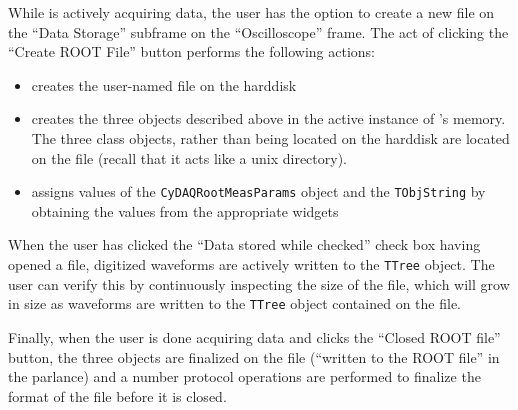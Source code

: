While \ADAQ is actively acquiring data, the user has
the option to create a new \ROOT file on the ``Data Storage'' subframe
on the ``Oscilloscope'' frame. The act of clicking the ``Create ROOT
File'' button performs the following actions:
\begin{itemize}
  \item{creates the user-named \ROOT file on the harddisk}
  \item{creates the three objects described above in the active
    instance of \ROOT's memory. The three class objects, rather than
    being located on the harddisk are located on the \ROOT file
    (recall that it acts like a unix directory).}
  \item{assigns values of the \texttt{CyDAQRootMeasParams} object and
    the \texttt{TObjString} by obtaining the values from the
    appropriate \ADAQ widgets}
\end{itemize}

When the user has clicked the ``Data stored while checked'' check box
having opened a \ROOT file, digitized waveforms are actively written
to the \ROOT \texttt{TTree} object. The user can verify this by
continuously inspecting the size of the \ROOT file, which will grow in
size as waveforms are written to the \ROOT \texttt{TTree} object
contained on the \ROOT file. 

Finally, when the user is done acquiring data and clicks the ``Closed
ROOT file'' button, the three objects are finalized on the \ROOT file
(``written to the ROOT file'' in the \ROOT parlance) and a number
\ROOT protocol operations are performed to finalize the format of the
\ROOT file before it is closed.



    
    



